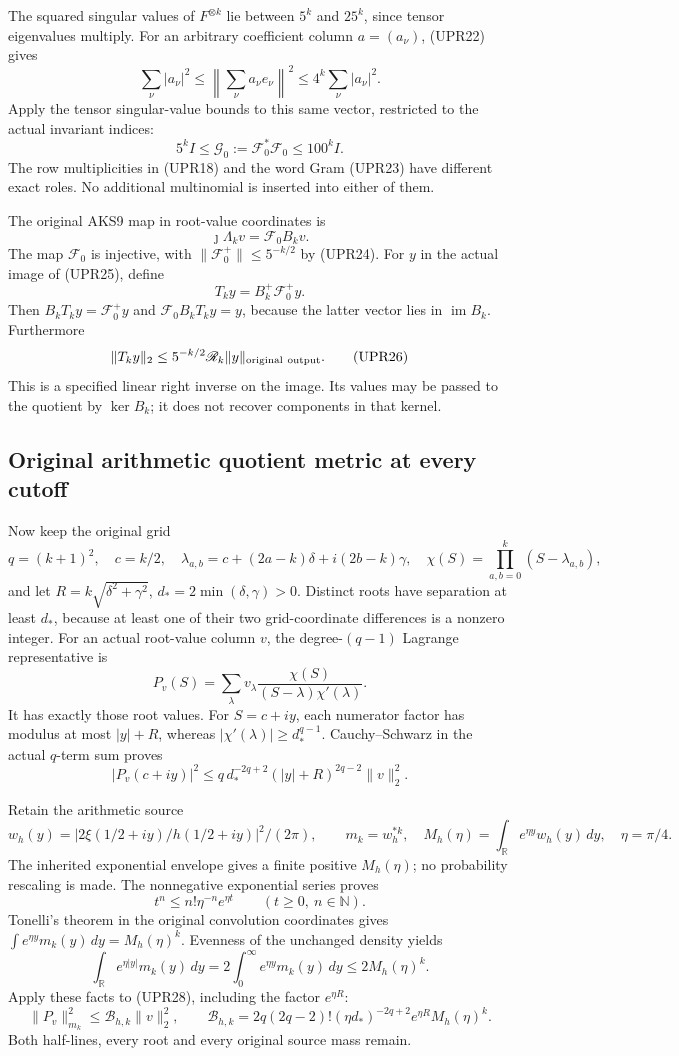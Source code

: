 The squared singular values of \(F^{\otimes k}\) lie between
\(5^k\) and \(25^k\), since tensor eigenvalues multiply.
For an arbitrary coefficient column \(a=(a_\nu)\), (UPR22) gives
\[
\sum_\nu|a_\nu|^2
\le\left\|\sum_\nu a_\nu e_\nu\right\|^2
\le4^k\sum_\nu|a_\nu|^2.
\]
Apply the tensor singular-value bounds to this same vector,
restricted to the actual invariant indices:
\[
\boxed{5^kI\le\mathcal G_0:=\mathcal F_0^*\mathcal F_0
\le100^kI.}
\tag{UPR24}
\]
The row multiplicities in (UPR18) and the word Gram (UPR23) have
different exact roles.  No additional multinomial is inserted
into either of them.

The original AKS9 map in root-value coordinates is
\[
\jmath\Lambda_k v=\mathcal F_0B_kv.
\tag{UPR25}
\]
The map \(\mathcal F_0\) is injective, with
\(\|\mathcal F_0^+\|\le5^{-k/2}\) by (UPR24).
For \(y\) in the actual image of (UPR25), define
\[
T_k y=B_k^+\mathcal F_0^+y.
\]
Then \(B_kT_ky=\mathcal F_0^+y\) and
\(\mathcal F_0B_kT_ky=y\), because the latter vector lies in
\(\operatorname{im}B_k\).  Furthermore
\[
\|T_ky\|_2\le5^{-k/2}\mathscr R_k\|y\|_{\rm original\ output}.
\tag{UPR26}
\]
This is a specified linear right inverse on the image.  Its values
may be passed to the quotient by \(\ker B_k\); it does not recover
components in that kernel.

\subsection{Original arithmetic quotient metric at every cutoff}
Now keep the original grid
\[
q=(k+1)^2,\quad c=k/2,\quad
\lambda_{a,b}=c+(2a-k)\delta+i(2b-k)\gamma,\quad
\chi(S)=\prod_{a,b=0}^k(S-\lambda_{a,b}),
\]
and let \(R=k\sqrt{\delta^2+\gamma^2}\),
\(d_*=2\min(\delta,\gamma)>0\).
Distinct roots have separation at least \(d_*\), because at least
one of their two grid-coordinate differences is a nonzero integer.
For an actual root-value column \(v\), the degree-\((q-1)\)
Lagrange representative is
\[
P_v(S)=\sum_\lambda
v_\lambda\frac{\chi(S)}{(S-\lambda)\chi'(\lambda)}.
\tag{UPR27}
\]
It has exactly those root values.  For \(S=c+iy\),
each numerator factor has modulus at most \(|y|+R\), whereas
\(|\chi'(\lambda)|\ge d_*^{q-1}\).
Cauchy--Schwarz in the actual \(q\)-term sum proves
\[
|P_v(c+iy)|^2
\le q\,d_*^{-2q+2}(|y|+R)^{2q-2}\|v\|_2^2.
\tag{UPR28}
\]

Retain the arithmetic source
\[
w_h(y)=|2\xi(1/2+iy)/h(1/2+iy)|^2/(2\pi),\qquad
m_k=w_h^{*k},
\quad
M_h(\eta)=\int_{\mathbb R}e^{\eta y}w_h(y)\,dy,\quad
\eta=\pi/4.
\]
The inherited exponential envelope gives a finite positive
\(M_h(\eta)\); no probability rescaling is made.
The nonnegative exponential series proves
\[
t^n\le n!\eta^{-n}e^{\eta t}\qquad(t\ge0,\ n\in\mathbb N).
\]
Tonelli's theorem in the original convolution coordinates gives
\(\int e^{\eta y}m_k(y)\,dy=M_h(\eta)^k\).
Evenness of the unchanged density yields
\[
\int_{\mathbb R}e^{\eta|y|}m_k(y)\,dy
=2\int_0^\infty e^{\eta y}m_k(y)\,dy
\le2M_h(\eta)^k.
\]
Apply these facts to (UPR28), including the factor \(e^{\eta R}\):
\[
\|P_v\|_{m_k}^2
\le\mathscr B_{h,k}\|v\|_2^2,\qquad
\mathscr B_{h,k}=
2q(2q-2)!(\eta d_*)^{-2q+2}
e^{\eta R}M_h(\eta)^k.
\tag{UPR29}
\]
Both half-lines, every root and every original source mass remain.

